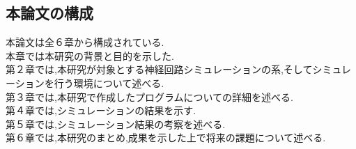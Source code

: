 \subsection{本論文の構成}

\indent 本論文は全６章から構成されている.\\
\indent 本章では本研究の背景と目的を示した.\\
\indent 第２章では,本研究が対象とする神経回路シミュレーションの系,そしてシミュレーションを行う環境について述べる.\\
\indent 第３章では,本研究で作成したプログラムについての詳細を述べる.\\
\indent 第４章では,シミュレーションの結果を示す.\\
\indent 第５章では,シミュレーション結果の考察を述べる.\\
\indent 第６章では,本研究のまとめ,成果を示した上で将来の課題について述べる.\\
